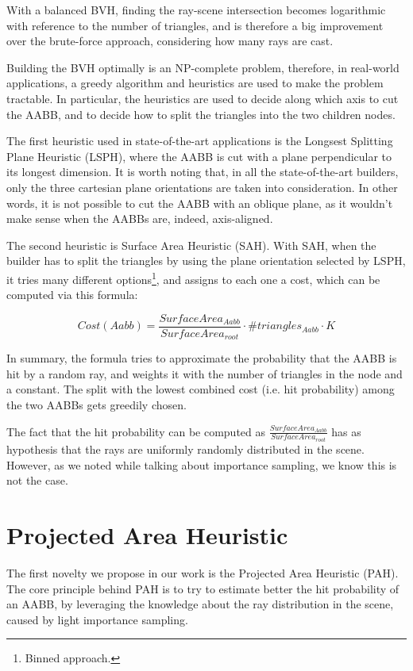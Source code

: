 \documentclass[11pt,a4paper,twocolumn]{article}
\begin{document}
With a balanced BVH, finding the ray-scene intersection becomes logarithmic with reference to the number of triangles, and is therefore a big improvement over the brute-force approach, considering how many rays are cast.

Building the BVH optimally is an NP-complete problem, therefore, in real-world applications, a greedy algorithm and heuristics are used to make the problem tractable. In particular, the heuristics are used to decide along which axis to cut the AABB, and to decide how to split the triangles into the two children nodes.

The first heuristic used in state-of-the-art applications is the Longsest Splitting Plane Heuristic (LSPH), where the AABB is cut with a plane perpendicular to its longest dimension. It is worth noting that, in all the state-of-the-art builders, only the three cartesian plane orientations are taken into consideration. In other words, it is not possible to cut the AABB with an oblique plane, as it wouldn't make sense when the AABBs are, indeed, axis-aligned.

The second heuristic is Surface Area Heuristic (SAH). With SAH, when the builder has to split the triangles by using the plane orientation selected by LSPH, it tries many different options\footnote{Binned approach.}, and assigns to each one a cost, which can be computed via this formula:

$$
Cost(Aabb) = \frac{SurfaceArea_{Aabb}}{SurfaceArea_{root}} \cdot \#triangles_{Aabb} \cdot K
$$

In summary, the formula tries to approximate the probability that the AABB is hit by a random ray, and weights it with the number of triangles in the node and a constant. The split with the lowest combined cost (i.e. hit probability) among the two AABBs gets greedily chosen.

The fact that the hit probability can be computed as $\frac{SurfaceArea_{Aabb}}{SurfaceArea_{root}}$ has as hypothesis that the rays are uniformly randomly distributed in the scene. However, as we noted while talking about importance sampling, we know this is not the case.

\section{Projected Area Heuristic}
The first novelty we propose in our work is the Projected Area Heuristic (PAH). The core principle behind PAH is to try to estimate better the hit probability of an AABB, by leveraging the knowledge about the ray distribution in the scene, caused by light importance sampling.
\end{document}
